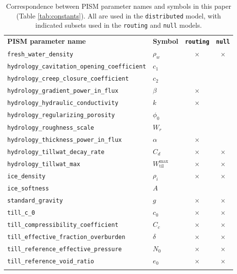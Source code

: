 \documentclass[gmd]{copernicus}   %
\newcommand{\text}{\textrm}
\newcommand{\Wtilmax}{W_{\text{til}}^{\text{max}}}
\begin{document}
\begin{table}[t]
  \caption{Correspondence between PISM parameter names and symbols in this paper (Table \ref{tab:constants}).  All are used in the \texttt{distributed} model, with indicated subsets used in the \texttt{routing} and \texttt{null} models.} \vskip4mm \centering
  \begin{tabular}{llcc} \tophline
    \textbf{PISM parameter name} & \textbf{Symbol} & \textbf{\texttt{routing}} & \textbf{\texttt{null}} \\
    \middlehline
    \verb|fresh_water_density| & $\rho_w$ & $\times$ & $\times$ \\
    \verb|hydrology_cavitation_opening_coefficient| & $c_1$ \\
    \verb|hydrology_creep_closure_coefficient| & $c_2$ \\
    \verb|hydrology_gradient_power_in_flux| &  $\beta$ & $\times$ & \\
    \verb|hydrology_hydraulic_conductivity| & $k$ & $\times$ & \\
    \verb|hydrology_regularizing_porosity| & $\phi_0$ \\
    \verb|hydrology_roughness_scale| & $W_r$ \\
    \verb|hydrology_thickness_power_in_flux| &  $\alpha$ & $\times$ & \\
    \verb|hydrology_tillwat_decay_rate| & $C_d$ & $\times$ & $\times$ \\
    \verb|hydrology_tillwat_max| & $\Wtilmax$ & $\times$ & $\times$ \\
    \verb|ice_density| & $\rho_i$ & $\times$ & $\times$ \\
    \verb|ice_softness| & $A$ \\
    \verb|standard_gravity| & $g$ & $\times$ & $\times$ \\
    \verb|till_c_0| & $c_0$ & $\times$ & $\times$ \\
    \verb|till_compressibility_coefficient| & $C_c$ & $\times$ & $\times$ \\
    \verb|till_effective_fraction_overburden| & $\delta$ & $\times$ & $\times$ \\
    \verb|till_reference_effective_pressure| & $N_0$ & $\times$ & $\times$ \\
    \verb|till_reference_void_ratio| & $e_0$ & $\times$ & $\times$ \\
    \bottomhline
  \end{tabular}
  \label{tab:correspondence}
\end{table}
\end{document}

